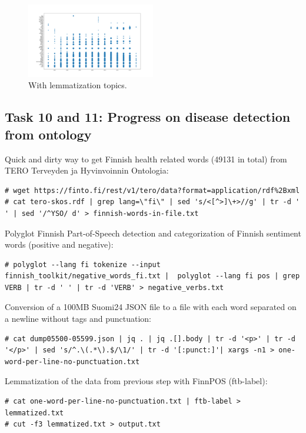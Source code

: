 \documentclass[conference]{IEEEtran}
\begin{document}
\begin{figure}[htbp]
    \centerline{\includegraphics[width=0.5\textwidth]{figures/fig16.png}}
    \caption{With lemmatization topics.}
    \label{with_lemmatization_topics}
\end{figure}







\subsection{Task 10 and 11: Progress on disease detection from ontology}

Quick and dirty way to get Finnish health related words (49131 in total) from TERO Terveyden ja Hyvinvoinnin Ontologia:
\begin{lstlisting}
# wget https://finto.fi/rest/v1/tero/data?format=application/rdf%2Bxml
# cat tero-skos.rdf | grep lang=\"fi\" | sed 's/<[^>]\+>//g' | tr -d ' ' | sed '/^YSO/ d' > finnish-words-in-file.txt
\end{lstlisting}

Polyglot Finnish Part-of-Speech detection and categorization of Finnish sentiment words (positive and negative):
\begin{lstlisting}
# polyglot --lang fi tokenize --input finnish_toolkit/negative_words_fi.txt |  polyglot --lang fi pos | grep VERB | tr -d ' ' | tr -d 'VERB' > negative_verbs.txt
\end{lstlisting}

Conversion of a 100MB Suomi24 JSON file to a file with each word separated on a newline without tags and punctuation:
\begin{lstlisting}
# cat dump05500-05599.json | jq . | jq .[].body | tr -d '<p>' | tr -d '</p>' | sed 's/^.\(.*\).$/\1/' | tr -d '[:punct:]'| xargs -n1 > one-word-per-line-no-punctuation.txt
\end{lstlisting}

Lemmatization of the data from previous step with FinnPOS (ftb-label):
\begin{lstlisting}
# cat one-word-per-line-no-punctuation.txt | ftb-label > lemmatized.txt
# cut -f3 lemmatized.txt > output.txt
\end{lstlisting}
\end{document}
